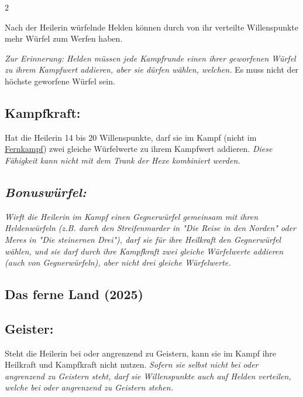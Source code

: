 \documentclass[10pt, a4paper, oneside]{book}
\newcommand{\fan}[1]{\textit{#1}}
\begin{document}
\begin{multicols*}{2}
\begin{nobgcolor}
Nach der Heilerin würfelnde Helden können durch von ihr verteilte Willenspunkte mehr Würfel zum Werfen haben.
\supercite{DfL:Begleitheft}

\fan{Zur Erinnerung: Helden müssen jede Kampfrunde einen ihrer geworfenen Würfel zu ihrem Kampfwert addieren, aber sie dürfen wählen, welchen.} Es muss nicht der höchste geworfene Würfel sein.
\supercite{127533}









\subsection{Kampfkraft:}

Hat die Heilerin 14 bis 20 Willenspunkte, darf sie im Kampf (nicht im \hyperref[Fernkämpfer]{Fernkampf}\supercite{DfL:Begleitheft}) zwei gleiche Würfelwerte zu ihrem Kampfwert addieren.
\fan{Diese Fähigkeit kann nicht mit dem Trank der Hexe kombiniert werden.}



\subsection{\fan{Bonuswürfel:}}

\fan{Wirft die Heilerin im Kampf einen Gegnerwürfel gemeinsam mit ihren Heldenwürfeln (z.B. durch den Streifenmarder in "Die Reise in den Norden" oder Meres in "Die steinernen Drei"), darf sie für ihre Heilkraft den Gegnerwürfel wählen, und sie darf durch ihre Kampfkraft zwei gleiche Würfelwerte addieren (auch von Gegnerwürfeln), aber nicht drei gleiche Würfelwerte.}



\end{nobgcolor}





\columnbreak

\begin{bgcolor}
\section{Das ferne Land (2025)}

\subsection{Geister:}

Steht die Heilerin bei oder angrenzend zu Geistern, kann sie im Kampf ihre Heilkraft und Kampfkraft nicht nutzen. \fan{Sofern sie selbst nicht bei oder angrenzend zu Geistern steht, darf sie Willenspunkte auch auf Helden verteilen, welche bei oder angrenzend zu Geistern stehen.}

\end{bgcolor}


\end{multicols*}
\end{document}
